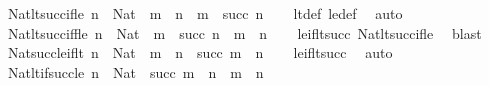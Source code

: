 \begin{isabellebody}
%
\isadelimproof
\isanewline
%
\endisadelimproof
\isanewline
{}\isamarkupfalse%
\ Nat{\isacharunderscore}{\kern0pt}lt{\isacharunderscore}{\kern0pt}succ{\isacharunderscore}{\kern0pt}if{\isacharunderscore}{\kern0pt}le{\isacharcolon}{\kern0pt}\ {\isachardoublequoteopen}n\ {\isacharcolon}{\kern0pt}\ Nat\ {\isasymLongrightarrow}\ m\ {\isasymle}\ n\ {\isasymLongrightarrow}\ m\ {\isacharless}{\kern0pt}\ succ\ n{\isachardoublequoteclose}\isanewline
%
\isadelimproof
\ \ %
\endisadelimproof
%
\isatagproof
{}\isamarkupfalse%
\ lt{\isacharunderscore}{\kern0pt}def\ le{\isacharunderscore}{\kern0pt}def\ \isamarkupfalse%
\ auto%
\endisatagproof
{\isafoldproof}%
%
\isadelimproof
\isanewline
%
\endisadelimproof
\isanewline
{}\isamarkupfalse%
\ Nat{\isacharunderscore}{\kern0pt}lt{\isacharunderscore}{\kern0pt}succ{\isacharunderscore}{\kern0pt}iff{\isacharunderscore}{\kern0pt}le{\isacharcolon}{\kern0pt}\ {\isachardoublequoteopen}n\ {\isacharcolon}{\kern0pt}\ Nat\ {\isasymLongrightarrow}\ m\ {\isacharless}{\kern0pt}\ succ\ n\ {\isasymlongleftrightarrow}\ m\ {\isasymle}\ n{\isachardoublequoteclose}\isanewline
%
\isadelimproof
\ \ %
\endisadelimproof
%
\isatagproof
{}\isamarkupfalse%
\ le{\isacharunderscore}{\kern0pt}if{\isacharunderscore}{\kern0pt}lt{\isacharunderscore}{\kern0pt}succ\ Nat{\isacharunderscore}{\kern0pt}lt{\isacharunderscore}{\kern0pt}succ{\isacharunderscore}{\kern0pt}if{\isacharunderscore}{\kern0pt}le\ \isamarkupfalse%
\ blast%
\endisatagproof
{\isafoldproof}%
%
\isadelimproof
\isanewline
%
\endisadelimproof
\isanewline
{}\isamarkupfalse%
\ Nat{\isacharunderscore}{\kern0pt}succ{\isacharunderscore}{\kern0pt}le{\isacharunderscore}{\kern0pt}if{\isacharunderscore}{\kern0pt}lt{\isacharcolon}{\kern0pt}\ {\isachardoublequoteopen}n\ {\isacharcolon}{\kern0pt}\ Nat\ {\isasymLongrightarrow}\ m\ {\isacharless}{\kern0pt}\ n\ {\isasymLongrightarrow}\ succ\ m\ {\isasymle}\ n{\isachardoublequoteclose}\isanewline
%
\isadelimproof
\ \ %
\endisadelimproof
%
\isatagproof
{}\isamarkupfalse%
\ le{\isacharunderscore}{\kern0pt}if{\isacharunderscore}{\kern0pt}lt{\isacharunderscore}{\kern0pt}succ\ \isamarkupfalse%
\ auto%
\endisatagproof
{\isafoldproof}%
%
\isadelimproof
\isanewline
%
\endisadelimproof
\isanewline
{}\isamarkupfalse%
\ Nat{\isacharunderscore}{\kern0pt}lt{\isacharunderscore}{\kern0pt}if{\isacharunderscore}{\kern0pt}succ{\isacharunderscore}{\kern0pt}le{\isacharcolon}{\kern0pt}\ {\isachardoublequoteopen}n\ {\isacharcolon}{\kern0pt}\ Nat\ {\isasymLongrightarrow}\ succ\ m\ {\isasymle}\ n\ {\isasymLongrightarrow}\ m\ {\isacharless}{\kern0pt}\ n{\isachardoublequoteclose}\isanewline

\end{isabellebody}
